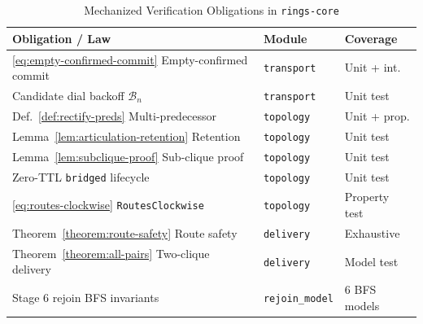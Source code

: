 \documentclass[journal]{IEEEtran}
\begin{document}
\begin{table}[t]
\centering
\caption{Mechanized Verification Obligations in \texttt{rings-core}}
\label{tab:verification}
\footnotesize
\begin{tabular}{@{}lll@{}}
\toprule
\textbf{Obligation / Law} & \textbf{Module} & \textbf{Coverage} \\
\midrule
\eqref{eq:empty-confirmed-commit} Empty-confirmed commit & \texttt{transport} & Unit + int. \\
Candidate dial backoff $\mathcal{B}_n$ & \texttt{transport} & Unit test \\
Def.~\ref{def:rectify-preds} Multi-predecessor & \texttt{topology} & Unit + prop. \\
Lemma~\ref{lem:articulation-retention} Retention & \texttt{topology} & Unit test \\
Lemma~\ref{lem:subclique-proof} Sub-clique proof & \texttt{topology} & Unit test \\
Zero-TTL \texttt{bridged} lifecycle & \texttt{topology} & Unit test \\
\eqref{eq:routes-clockwise} \texttt{RoutesClockwise} & \texttt{topology} & Property test \\
Theorem~\ref{theorem:route-safety} Route safety & \texttt{delivery} & Exhaustive \\
Theorem~\ref{theorem:all-pairs} Two-clique delivery & \texttt{delivery} & Model test \\
Stage 6 rejoin BFS invariants & \texttt{rejoin\_model} & 6 BFS models \\
\bottomrule
\end{tabular}
\end{table}



\end{document}
